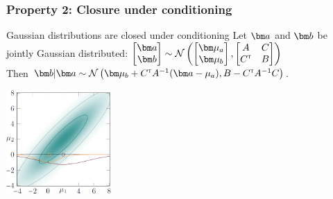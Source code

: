 \begin{frame}
\begin{columns}[T]
\end{columns}
\end{frame}


\begin{frame}
\frametitle{Property 2: Closure under conditioning}

\begin{block}{Gaussian distributions are closed under conditioning}
Let $\ba$ and $\bb$ be jointly Gaussian distributed:
\vspace*{0.1cm}
$\begin{bmatrix}
\ba\\
\bb
\end{bmatrix}
\sim \norm\left(
\begin{bmatrix}
\bmu_a\\
\bmu_b
\end{bmatrix},
\begin{bmatrix}
A & C\\
C\transpose & B
\end{bmatrix}
\right)$\\
\vspace*{0.1cm}
Then $\bb | \ba \sim \norm\left( \bmu_b + C\transpose A\inv (\ba-\mu_a), B - C\transpose{} A\inv{} C \right)$.
\end{block}

\centering
\includegraphics[width=0.3\textwidth]{images/plots/Gaussian-2d-conditioning}

\end{frame}


